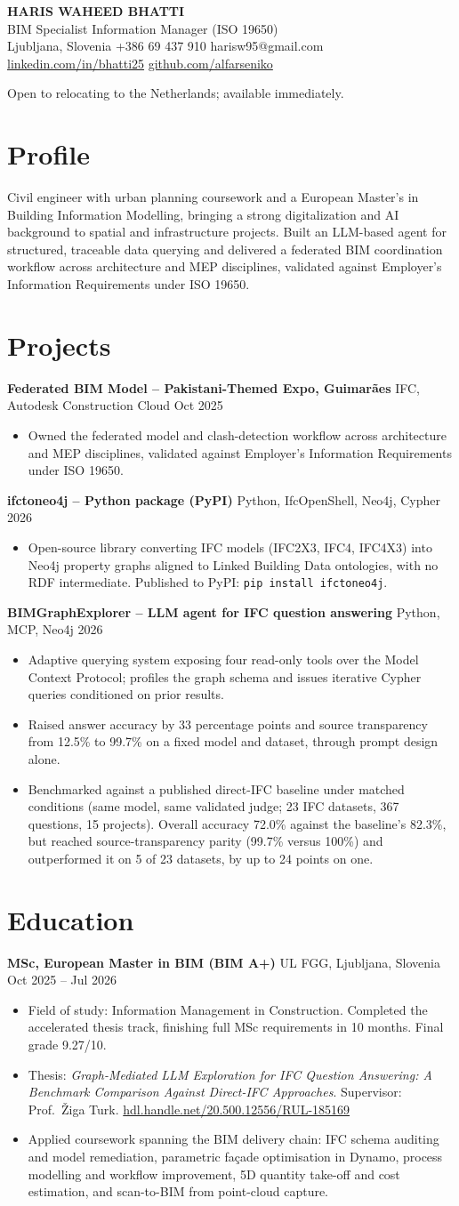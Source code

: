 \documentclass[a4paper,10.5pt]{article}
\newcommand{\datefill}{\dotfill}
\newcommand{\entry}[3]{\vspace{2.5pt}\noindent\textbf{#1} \textbar{} #2 \datefill{} #3\par\vspace{0.5pt}}
\newcommand{\ROLELINE}{BIM Specialist \textbar{} Information Manager (ISO 19650)}
\newcommand{\projIfcToNeo}{%
\entry{ifctoneo4j -- Python package (PyPI)}{Python, IfcOpenShell, Neo4j, Cypher}{2026}
\begin{itemize}
  \item Open-source library converting IFC models (IFC2X3, IFC4, IFC4X3) into Neo4j
        property graphs aligned to Linked Building Data ontologies, with no RDF
        intermediate. Published to PyPI: \texttt{pip install ifctoneo4j}.
\end{itemize}}
\newcommand{\projBIMGraph}{%
\entry{BIMGraphExplorer -- LLM agent for IFC question answering}{Python, MCP, Neo4j}{2026}
\begin{itemize}
  \item Adaptive querying system exposing four read-only tools over the Model
        Context Protocol; profiles the graph schema and issues iterative Cypher
        queries conditioned on prior results.
  \item Raised answer accuracy by 33 percentage points and source transparency from
        12.5\% to 99.7\% on a fixed model and dataset, through prompt design alone.
  \item Benchmarked against a published direct-IFC baseline under matched
        conditions (same model, same validated judge; 23 IFC datasets, 367
        questions, 15 projects). Overall accuracy 72.0\% against the baseline's
        82.3\%, but reached source-transparency parity (99.7\% versus 100\%) and
        outperformed it on 5 of 23 datasets, by up to 24 points on one.
\end{itemize}}
\newcommand{\projGuimaraes}{%
\entry{Federated BIM Model -- Pakistani-Themed Expo, Guimar\~aes}{IFC, Autodesk Construction Cloud}{Oct 2025}
\begin{itemize}
  \item Owned the federated model and clash-detection workflow across architecture
        and MEP disciplines, validated against Employer's Information Requirements
        under ISO 19650.
\end{itemize}}
\begin{document}
\begin{center}
  {\LARGE\bfseries HARIS WAHEED BHATTI}\\[2pt]
  {\large \ROLELINE}\\[3pt]
  Ljubljana, Slovenia \textbar{} +386 69 437 910 \textbar{} harisw95@gmail.com\\
  \href{https://linkedin.com/in/bhatti25}{linkedin.com/in/bhatti25} \textbar{}
  \href{https://github.com/alfarseniko}{github.com/alfarseniko}
\end{center}
\vspace{-4pt}
\noindent\small Open to relocating to the Netherlands; available immediately.\normalsize

\section{Profile}

\noindent Civil engineer with urban planning coursework and a European Master's in
Building Information Modelling, bringing a strong digitalization and AI background to
spatial and infrastructure projects. Built an LLM-based agent for structured,
traceable data querying and delivered a federated BIM coordination workflow across
architecture and MEP disciplines, validated against Employer's Information
Requirements under ISO 19650.

\section{Projects}

 \projGuimaraes \projIfcToNeo \projBIMGraph

\section{Education}
\entry{MSc, European Master in BIM (BIM A+)}{UL FGG, Ljubljana, Slovenia}{Oct 2025 -- Jul 2026}
\begin{itemize}
  \item Field of study: Information Management in Construction. Completed the
        accelerated thesis track, finishing full MSc requirements in 10 months.
        Final grade 9.27/10.
  \item Thesis: \textit{Graph-Mediated LLM Exploration for IFC Question Answering:
        A Benchmark Comparison Against Direct-IFC Approaches}. Supervisor:
        Prof.~\v{Z}iga Turk. \href{http://hdl.handle.net/20.500.12556/RUL-185169}{hdl.handle.net/20.500.12556/RUL-185169}
  \item Applied coursework spanning the BIM delivery chain: IFC schema auditing and model remediation, parametric façade optimisation in Dynamo, process modelling and workflow improvement, 5D quantity take-off and cost estimation, and scan-to-BIM from point-cloud capture.
\end{itemize}
\end{document}
